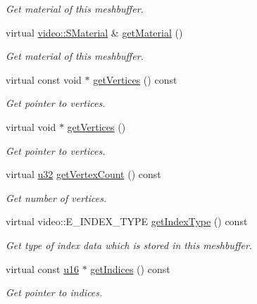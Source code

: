 \begin{DoxyCompactItemize}
\begin{DoxyCompactList}\small\item\em Get material of this meshbuffer. \end{DoxyCompactList}\item 
virtual \hyperlink{classirr_1_1video_1_1SMaterial}{video\+::\+S\+Material} \& \hyperlink{classirr_1_1scene_1_1CMeshBuffer_af69e8356b4525a3fee1ddbf188d81e8a}{get\+Material} ()
\begin{DoxyCompactList}\small\item\em Get material of this meshbuffer. \end{DoxyCompactList}\item 
virtual const void $\ast$ \hyperlink{classirr_1_1scene_1_1CMeshBuffer_ad9463b97ee94bbc26bbb11bf867ea830}{get\+Vertices} () const
\begin{DoxyCompactList}\small\item\em Get pointer to vertices. \end{DoxyCompactList}\item 
virtual void $\ast$ \hyperlink{classirr_1_1scene_1_1CMeshBuffer_a9173c9d0c6f32890ab75dc501aaf5be6}{get\+Vertices} ()
\begin{DoxyCompactList}\small\item\em Get pointer to vertices. \end{DoxyCompactList}\item 
virtual \hyperlink{namespaceirr_a0416a53257075833e7002efd0a18e804}{u32} \hyperlink{classirr_1_1scene_1_1CMeshBuffer_a72ee778498eff327a20c6be179976994}{get\+Vertex\+Count} () const
\begin{DoxyCompactList}\small\item\em Get number of vertices. \end{DoxyCompactList}\item 
virtual video\+::\+E\+\_\+\+I\+N\+D\+E\+X\+\_\+\+T\+Y\+PE \hyperlink{classirr_1_1scene_1_1CMeshBuffer_aa183491690fa47b4697bbfcc7902301c}{get\+Index\+Type} () const
\begin{DoxyCompactList}\small\item\em Get type of index data which is stored in this meshbuffer. \end{DoxyCompactList}\item 
virtual const \hyperlink{namespaceirr_ae9f8ec82692ad3b83c21f555bfa70bcc}{u16} $\ast$ \hyperlink{classirr_1_1scene_1_1CMeshBuffer_a23af7e8ffb2ba674d1dd4448cea288bf}{get\+Indices} () const
\begin{DoxyCompactList}\small\item\em Get pointer to indices. \end{DoxyCompactList}\item 

\end{DoxyCompactItemize}
